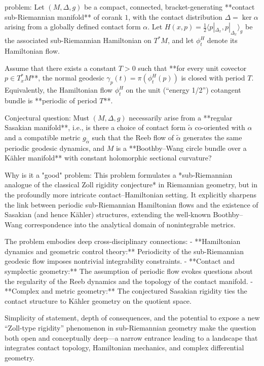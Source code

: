 problem:  
Let \((M,\Delta,g)\) be a compact, connected, bracket-generating **contact sub-Riemannian manifold** of corank \(1\), with the contact distribution \(\Delta = \ker \alpha\) arising from a globally defined contact form \(\alpha\). Let \(H(x,p) = \tfrac{1}{2}\langle p|_{\Delta_x}, p|_{\Delta_x} \rangle_g\) be the associated sub-Riemannian Hamiltonian on \(T^*M\), and let \(\phi_t^H\) denote its Hamiltonian flow.  

Assume that there exists a constant \(T>0\) such that **for every unit covector \(p \in T^*_x M\)**, the normal geodesic \(\gamma_p(t) = \pi(\phi_t^H(p))\) is closed with period \(T\). Equivalently, the Hamiltonian flow \(\phi_t^H\) on the unit (“energy 1/2”) cotangent bundle is **periodic of period \(T\)**.  

Conjectural question:  
Must \((M,\Delta,g)\) necessarily arise from a **regular Sasakian manifold**, i.e., is there a choice of contact form \(\tilde{\alpha}\) co-oriented with \(\alpha\) and a compatible metric \(g_{\tilde{\alpha}}\) such that the Reeb flow of \(\tilde{\alpha}\) generates the same periodic geodesic dynamics, and \(M\) is a **Boothby–Wang circle bundle over a Kähler manifold** with constant holomorphic sectional curvature?  

Why is it a "good" problem:  
This problem formulates a *sub-Riemannian analogue of the classical Zoll rigidity conjecture* in Riemannian geometry, but in the profoundly more intricate contact–Hamiltonian setting. It explicitly sharpens the link between periodic sub-Riemannian Hamiltonian flows and the existence of Sasakian (and hence Kähler) structures, extending the well-known Boothby–Wang correspondence into the analytical domain of nonintegrable metrics.  

The problem embodies deep cross-disciplinary connections:  
- **Hamiltonian dynamics and geometric control theory:** Periodicity of the sub-Riemannian geodesic flow imposes nontrivial integrability constraints.  
- **Contact and symplectic geometry:** The assumption of periodic flow evokes questions about the regularity of the Reeb dynamics and the topology of the contact manifold.  
- **Complex and metric geometry:** The conjectured Sasakian rigidity ties the contact structure to Kähler geometry on the quotient space.  

Simplicity of statement, depth of consequences, and the potential to expose a new “Zoll-type rigidity” phenomenon in sub-Riemannian geometry make the question both open and conceptually deep—a narrow entrance leading to a landscape that integrates contact topology, Hamiltonian mechanics, and complex differential geometry.